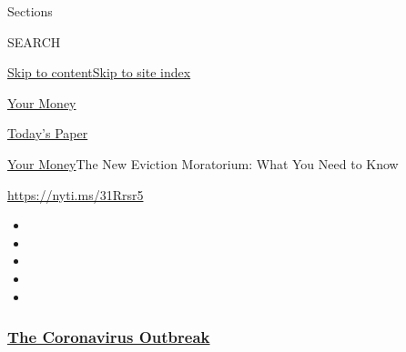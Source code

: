 Sections

SEARCH

\protect\hyperlink{site-content}{Skip to
content}\protect\hyperlink{site-index}{Skip to site index}

\href{https://www.nytimes3xbfgragh.onion/section/your-money}{Your Money}

\href{https://myaccount.nytimes3xbfgragh.onion/auth/login?response_type=cookie\&client_id=vi}{}

\href{https://www.nytimes3xbfgragh.onion/section/todayspaper}{Today's
Paper}

\href{/section/your-money}{Your Money}\textbar{}The New Eviction
Moratorium: What You Need to Know

\url{https://nyti.ms/31Rrsr5}

\begin{itemize}
\item
\item
\item
\item
\item
\end{itemize}

\hypertarget{the-coronavirus-outbreak}{%
\subsubsection{\texorpdfstring{\href{https://www.nytimes3xbfgragh.onion/news-event/coronavirus?name=styln-coronavirus-national\&region=TOP_BANNER\&block=storyline_menu_recirc\&action=click\&pgtype=Article\&impression_id=45692b90-efb9-11ea-99c0-252aeb508ca6\&variant=undefined}{The
Coronavirus
Outbreak}}{The Coronavirus Outbreak}}\label{the-coronavirus-outbreak}}

